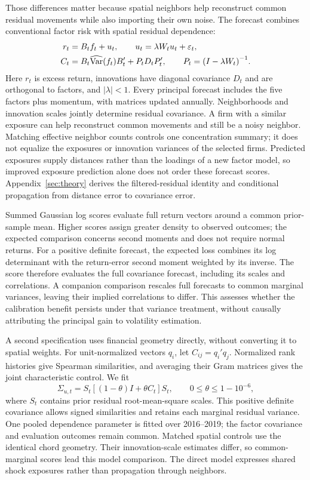 \documentclass[11pt]{article}
\begin{document}
Those differences matter because spatial neighbors help reconstruct common
residual movements while also importing their own noise. The forecast combines
conventional factor risk with spatial residual dependence:
\begin{align}
  r_t&=B_t f_t+u_t,\qquad u_t=\lambda W_t u_t+\varepsilon_t,\notag\\
  C_t&=B_t\widehat{\operatorname{Var}}(f_t)B_t'+P_t D_t P_t',
  \qquad P_t={(I-\lambda W_t)}^{-1}.\label{eq:forecast}
\end{align}
Here $r_t$ is excess return, innovations have diagonal covariance $D_t$ and are
orthogonal to factors, and $|\lambda|<1$. Every principal forecast includes the
five factors plus momentum, with matrices updated annually. Neighborhoods and
innovation scales jointly determine residual covariance. A firm with a similar
exposure can help reconstruct common movements and still be a noisy neighbor.
Matching effective neighbor counts controls one concentration summary; it
does not equalize the exposures or innovation variances of the
selected firms. Predicted exposures
supply distances rather than the loadings of a new factor model, so improved
exposure prediction alone does not order these forecast scores.
Appendix~\ref{sec:theory} derives the filtered-residual identity and conditional
propagation from distance error to covariance error.

Summed Gaussian log scores evaluate full return vectors around a common
prior-sample mean. Higher scores assign greater density to observed outcomes;
the expected comparison concerns second moments and does not require normal
returns. For a positive definite forecast, the expected loss combines its log
determinant with the return-error second moment weighted by its inverse.
The score therefore evaluates the full covariance forecast, including its
scales and correlations. A companion comparison rescales full
forecasts to common marginal
variances, leaving their implied correlations to differ. This assesses whether
the calibration benefit persists under that variance treatment, without causally
attributing the principal gain to volatility estimation.

A second specification uses financial geometry directly, without converting it
to spatial weights. For unit-normalized vectors $q_i$, let $C_{ij}=q_i'q_j$.
Normalized rank histories give Spearman similarities, and averaging their Gram
matrices gives the joint characteristic control. We fit
\begin{equation}\label{eq:gram-covariance}
  \Sigma_{u,t}=S_t[(1-\theta)I+\theta C_t]S_t,
  \qquad 0\leq\theta\leq1-10^{-6},
\end{equation}
where $S_t$ contains prior residual root-mean-square scales. This positive
definite covariance allows signed similarities and retains each marginal
residual variance. One pooled dependence parameter is fitted over 2016--2019;
the factor covariance and evaluation outcomes remain common. Matched spatial
controls use the identical chord geometry. Their innovation-scale estimates
differ, so common-marginal scores lead this model comparison. The direct model
expresses shared shock exposures rather than propagation through neighbors.
\end{document}
